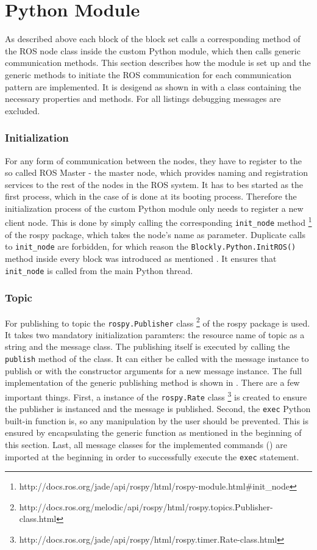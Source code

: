 \section{Python Module} \label{sec:PythonModule}
As described above each block of the \hobbit{} block set calls a corresponding method of the ROS node class inside the custom Python module, which then calls generic communication methods. This section describes how the module is set up and the generic methods to initiate the ROS communication for each communication pattern are implemented. It is desigend as shown in  with a class containing the necessary properties and methods. For all listings debugging messages are excluded.

\subsubsection{Initialization}
For any form of communication between the nodes, they have to register to the so called ROS Master - the master node, which provides naming and registration services to the rest of the nodes in the ROS system. It has to bes started as the first process, which in the case of \hobbit{} is done at its booting process. Therefore the initialization process of the custom Python module only needs to register a new client node. This is done by simply calling the corresponding \lstinline!init_node! method \footnote{http://docs.ros.org/jade/api/rospy/html/rospy-module.html#init_node} of the rospy package, which takes the node's name as parameter. Duplicate calls to \lstinline!init_node! are forbidden, for which reason the \lstinline!Blockly.Python.InitROS()! method inside every block was introduced as mentioned . It ensures that \lstinline!init_node! is called from the main Python thread.

\subsubsection{Topic}
For publishing to topic the \lstinline!rospy.Publisher! class \footnote{http://docs.ros.org/melodic/api/rospy/html/rospy.topics.Publisher-class.html} of the rospy package is used. It takes two mandatory initialization paramters: the resource name of topic as a string and the message class. The publishing itself is executed by calling the \lstinline!publish! method of the class. It can either be called with the message instance to publish or with the constructor arguments for a new message instance. The full implementation of the generic publishing method is shown in . There are a few important things. First, a instance of the \lstinline!rospy.Rate! class \footnote{http://docs.ros.org/jade/api/rospy/html/rospy.timer.Rate-class.html} is created to ensure the publisher is instanced and the message is published. Second, the \lstinline!exec! Python built-in function is, so any manipulation by the user should be prevented. This is ensured by encapsulating the generic function as mentioned in the beginning of this section. Last, all message classes for the implemented commands () are imported at the beginning in order to successfully execute the \lstinline!exec! statement.

